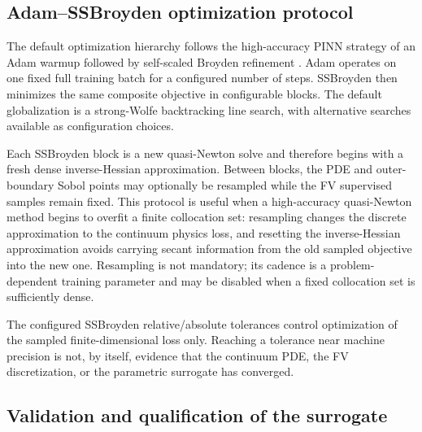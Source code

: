 \documentclass[11pt]{article}
\begin{document}
\subsection{Adam--SSBroyden optimization protocol}
\label{sec:pinn_optimization}

The default optimization hierarchy follows the high-accuracy PINN strategy of an Adam
warmup followed by self-scaled Broyden refinement
\cite{Urban2025PINN}.  Adam operates on one fixed full training batch for a configured
number of steps.  SSBroyden then minimizes the same composite objective in configurable
blocks.  The default globalization is a strong-Wolfe backtracking line search, with
alternative searches available as configuration choices.

Each SSBroyden block is a new quasi-Newton solve and therefore begins with a fresh dense
inverse-Hessian approximation.  Between blocks, the PDE and outer-boundary Sobol points
may optionally be resampled while the FV supervised samples remain fixed.  This protocol
is useful when a high-accuracy quasi-Newton method begins to overfit a finite collocation
set: resampling changes the discrete approximation to the continuum physics loss, and
resetting the inverse-Hessian approximation avoids carrying secant information from the
old sampled objective into the new one.  Resampling is not mandatory; its cadence is a
problem-dependent training parameter and may be disabled when a fixed collocation set is
sufficiently dense.

The configured SSBroyden relative/absolute tolerances control optimization of the sampled
finite-dimensional loss only.  Reaching a tolerance near machine precision is not, by
itself, evidence that the continuum PDE, the FV discretization, or the parametric
surrogate has converged.

\subsection{Validation and qualification of the surrogate}
\label{sec:pinn_qualification}
\end{document}

